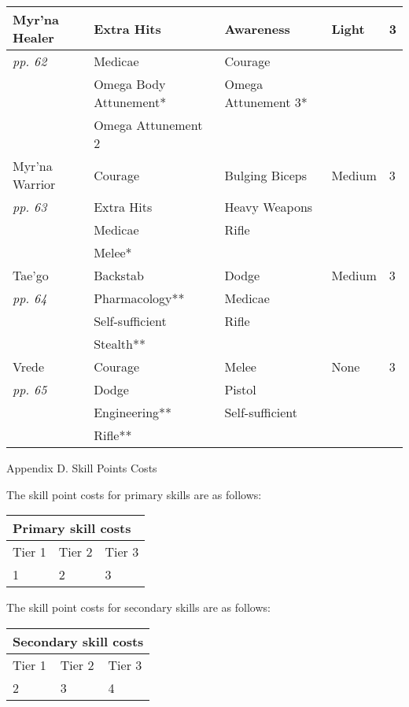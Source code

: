 \documentclass{scrbook}
\begin{document}
\begin{table}
\begin{tabular}{|l|l|l|l|l|} \hline 
Myr'na Healer & Extra Hits & Awareness & Light & 3 \\
 \hline \textit{pp. 62} & Medicae & Courage &  &  \\
 \hline  & Omega Body Attunement* & Omega Attunement 3* &  &  \\
 \hline  & Omega Attunement 2 &  &  &  \\
 \hline Myr'na Warrior & Courage & Bulging Biceps & Medium & 3 \\
 \hline \textit{pp. 63} & Extra Hits & Heavy Weapons &  &  \\
 \hline  & Medicae & Rifle &  &  \\
 \hline  & Melee* &  &  &  \\
 \hline Tae'go & Backstab & Dodge & Medium & 3 \\
 \hline \textit{pp. 64} & Pharmacology** & Medicae &  &  \\
 \hline  & Self-sufficient & Rifle &  &  \\
 \hline  & Stealth** &  &  &  \\
 \hline Vrede & Courage & Melee & None & 3 \\
 \hline \textit{pp. 65} & Dodge & Pistol &  &  \\
 \hline  & Engineering** & Self-sufficient &  &  \\
 \hline  & Rifle** &  &  &  \\
 \hline \end{tabular}

\end{table}

Appendix D. Skill Points Costs

The skill point costs for primary skills are as follows:

\begin{table}
\begin{tabular}{|l|l|l|} \hline 
\multicolumn{3}{|l|}{Primary skill costs} \\
 \hline Tier 1 & Tier 2 & Tier 3 \\
 \hline 1 & 2 & 3 \\
 \hline \end{tabular}

\end{table}

The skill point costs for secondary skills are as follows:

\begin{table}
\begin{tabular}{|l|l|l|} \hline 
\multicolumn{3}{|l|}{Secondary skill costs} \\
 \hline Tier 1 & Tier 2 & Tier 3 \\
 \hline 2 & 3 & 4 \\
 \hline \end{tabular}

\end{table}
\end{document}
